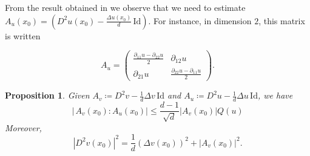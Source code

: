\documentclass[11pt,a4paper]{article}
\numberwithin{equation}{section}
\theoremstyle{plain}
\newtheorem{lemma}[theorem]{Lemma}
\newtheorem{proposition}[theorem]{Proposition}
\theoremstyle{remark}
\newcommand {\f}{\frac}
\begin{document}
From the result obtained in  we observe that we need to estimate  $ A_u (x_0) = \left(D^2 u(x_0) - \f{\Delta u(x_0)}{d} \,\mathrm{Id}\right)$. For instance, in dimension $2$, this matrix is written

\[
A_u  = 
\begin{pmatrix}
\f{\partial_{11} u - \partial_{22} u}{2}
&
\partial_{12} u 
\\[6pt]
\partial_{21} u 
&
\f{\partial_{22} u - \partial_{11} u}{2}
\end{pmatrix}.
\]


\begin{proposition}\label{prop:estimate_scalar_product}
Given $A_v \coloneqq D^2 v - \f1d\Delta v\,\mathrm{Id}$ and $A_u \coloneqq D^2 u - \f1d \Delta u\,\mathrm{Id}$, we have
\[
\left|\,A_v(x_0):A_u(x_0)\right|
  \le 
\frac{d-1}{\sqrt{d}}|A_v(x_0)|
Q(u)
\]
Moreover,
\[
\left|D^2 v(x_0)\right|^2 
  = 
\f1d\left(\Delta v(x_0)\right)^2 
  + 
\left|A_v(x_0)\right|^2.
\]

\end{proposition}


\end{document}
